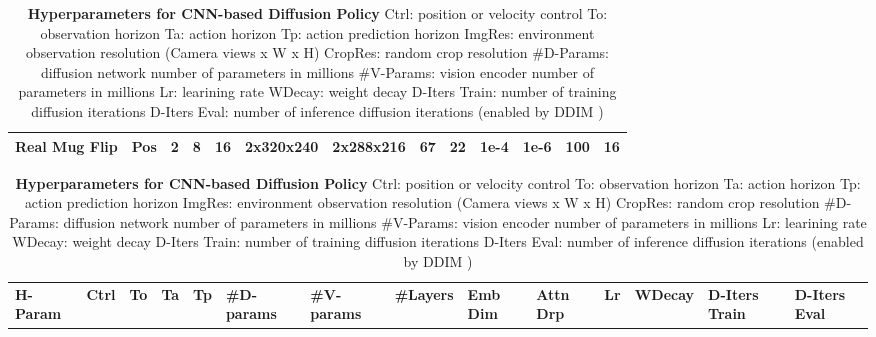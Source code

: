 \documentclass[Afour,sageh,times]{sagej}
\begin{document}
\begin{table}
\begin{tabular}{l|llllllllllll}
Real Mug Flip   & Pos  & 2  & 8  & 16 & 2x320x240 & 2x288x216 & 67       & 22       & 1e-4 & 1e-6   & 100           & 16           \\
\bottomrule
\end{tabular}%
\caption{
\textbf{Hyperparameters for CNN-based Diffusion Policy}
\label{tab:hparam_cnn}
Ctrl: position or velocity control 
To: observation horizon 
Ta: action horizon 
Tp: action prediction horizon 
ImgRes: environment observation resolution (Camera views x W x H) 
CropRes: random crop resolution 
\#D-Params: diffusion network number of parameters in millions 
\#V-Params: vision encoder number of parameters in millions 
Lr: learining rate 
WDecay: weight decay
D-Iters Train: number of training diffusion iterations
D-Iters Eval: number of inference diffusion iterations (enabled by DDIM \cite{song2021ddim})
}

\vspace{4mm}
\centering
\setlength\tabcolsep{2.1 pt}
\begin{tabular}{l|lllllllllllll}
\toprule
\textbf{H-Param} & \textbf{Ctrl} & \textbf{To} & \textbf{Ta} & \textbf{Tp} & \textbf{\#D-params} & \textbf{\#V-params} & \textbf{\#Layers} & \textbf{Emb Dim} & \textbf{Attn Drp} & \textbf{Lr} & \textbf{WDecay} & \textbf{D-Iters Train} & \textbf{D-Iters Eval} \\


\end{tabular}
\end{table}
\end{document}
